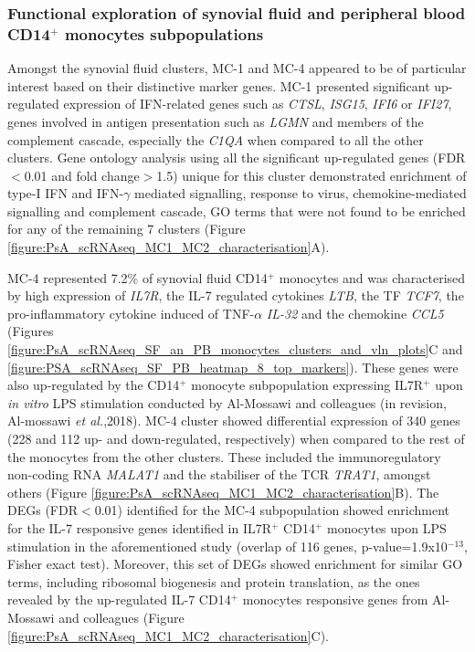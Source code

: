 \subsubsection{Functional exploration of synovial fluid and peripheral blood CD14$^+$ monocytes subpopulations}

Amongst the synovial fluid clusters, MC-1 and MC-4 appeared to be of particular interest based on their distinctive marker genes. MC-1 presented significant up-regulated expression of IFN-related genes  such as \textit{CTSL}, \textit{ISG15}, \textit{IFI6} or \textit{IFI27}, genes involved in antigen presentation such as \textit{LGMN} and members of the complement cascade, especially the \textit{C1QA} when compared to all the other clusters. Gene ontology analysis using all the significant up-regulated genes (FDR$<$0.01 and fold change$>$1.5) unique for this cluster  demonstrated enrichment of type-I IFN and IFN-$\gamma$ mediated signalling, response to virus, chemokine-mediated signalling and complement cascade, GO terms that were not found to be enriched for any of the remaining 7 clusters (Figure \ref{figure:PsA_scRNAseq_MC1_MC2_characterisation}A).



MC-4 represented 7.2\% of synovial fluid CD14$^+$ monocytes and was characterised by high expression of \textit{IL7R}, the IL-7 regulated cytokines \textit{LTB}, the TF \textit{TCF7}, the pro-inflammatory cytokine induced of TNF-$\alpha$ \textit{IL-32}  \parencite{Kim2005} and the chemokine \textit{CCL5} (Figures \ref{figure:PsA_scRNAseq_SF_an_PB_monocytes_clusters_and_vln_plots}C and \ref{figure:PSA_scRNAseq_SF_PB_heatmap_8_top_markers}). These genes were also up-regulated by the CD14$^+$ monocyte subpopulation expressing IL7R$^+$ upon \textit{in vitro} LPS stimulation conducted by Al-Mossawi and colleagues (in revision, Al-mossawi \textit{et al.},2018). MC-4 cluster showed differential expression of 340 genes (228 and 112 up- and down-regulated, respectively) when compared to the rest of the monocytes from the other clusters. These included the immunoregulatory non-coding RNA \textit{MALAT1} and the stabiliser of the TCR \textit{TRAT1}, amongst others (Figure \ref{figure:PsA_scRNAseq_MC1_MC2_characterisation}B). The DEGs (FDR$<$0.01) identified for the MC-4 subpopulation showed enrichment for the IL-7 responsive genes identified in IL7R$^+$ CD14$^+$ monocytes upon LPS stimulation in the aforementioned study \parencite{Al-Mossawi2018} (overlap of 116 genes, p-value=1.9x10$^{-13}$, Fisher exact test). Moreover, this set of DEGs showed enrichment for similar GO terms, including ribosomal biogenesis and protein translation, as the ones revealed by the up-regulated IL-7 CD14$^+$ monocytes responsive genes from Al-Mossawi and colleagues (Figure \ref{figure:PsA_scRNAseq_MC1_MC2_characterisation}C).


